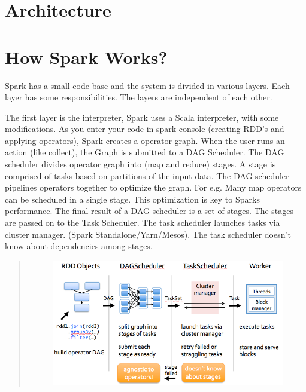\documentclass[letterpaper,11pt,english]{sphinxmanual}
\begin{document}
\section{Architecture}
\label{introduction:architecture}

\section{How Spark Works?}
\label{introduction:how-spark-works}
Spark has a small code base and the system is divided in various layers. Each layer has some responsibilities. The layers are independent of each other.

The first layer is the interpreter, Spark uses a Scala interpreter, with some modifications.
As you enter your code in spark console (creating RDD’s and applying operators), Spark creates a operator graph.
When the user runs an action (like collect), the Graph is submitted to a DAG Scheduler. The DAG scheduler divides operator graph into (map and reduce) stages.
A stage is comprised of tasks based on partitions of the input data. The DAG scheduler pipelines operators together to optimize the graph. For e.g. Many map operators can be scheduled in a single stage. This optimization is key to Sparks performance. The final result of a DAG scheduler is a set of stages.
The stages are passed on to the Task Scheduler. The task scheduler launches tasks via cluster manager. (Spark Standalone/Yarn/Mesos). The task scheduler doesn’t know about dependencies among stages.
\begin{quote}
\begin{figure}[htbp]
\centering

\includegraphics{work_flow.png}
\label{introduction:fig-workflow}\end{figure}
\end{quote}
\end{document}
